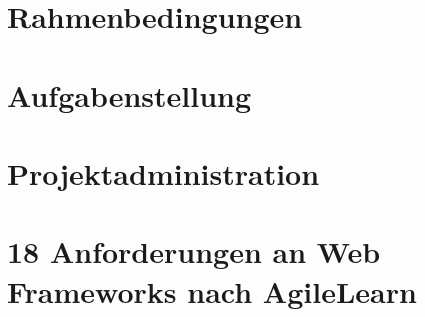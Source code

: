 \documentclass[
11pt, %
a4paper, %
BCOR25mm, %
DIV14, %
footsepline = false, %
headsepline, %
twoside, %
openright,
abstracton, %
listof=totocnumbered, %
bibliography=totocnumbered %
]{scrreprt}
\begin{document}
  \cleardoublepage
      
  
  \chapter{Rahmenbedingungen}\label{chapter:Rahmenbedingungen}
  
  
  
  \cleardoublepage
  
  
  \chapter{Aufgabenstellung}\label{chapter:Aufgabenstellung}
  
  

  \cleardoublepage
   
    
  \chapter{Projektadministration}\label{chapter:Projektadministration}
 
  

  \cleardoublepage
   
    
  \chapter{18 Anforderungen an Web Frameworks nach
  AgileLearn}\label{chapter:18AnforderungenNachAgileLearn}
 
\end{document}

